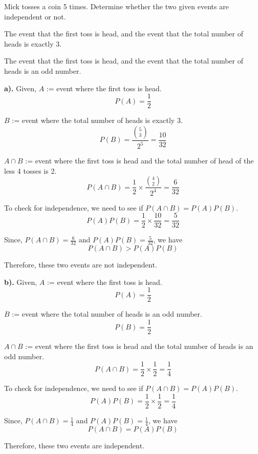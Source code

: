 \documentclass[a4paper, 10pt]{article}
\begin{document}
\pagebreak

\begin{problem}
Mick tosses a coin 5 times.
Determine whether the two given events are independent or not.
\begin{subproblems_alpha}
	\item The event that the first toss is head, and the event that the total number of heads is exactly 3.
	\item The event that the first toss is head, and the event that the total number of heads is an odd number.
\end{subproblems_alpha}
\end{problem}

\begin{solution}
	\par\noindent\textbf{a).} Given, \newline
	\( A \) := event where the first toss is head.
	\[
		P(A) = \frac{1}{2}
	\]

	\( B \) := event where the total number of heads is exactly 3.
	\[
		P(B) = \frac{\binom{5}{3}}{2^5} = \frac{10}{32}
	\]

	\( A \cap B \) := event where the first toss is head and the total number of head of the less 4 tosses is 2.
	\[
		P(A \cap B) = \frac{1}{2} \times \frac{\binom{4}{2}}{2^4} = \frac{6}{32}
	\]

	To check for independence, we need to see if \( P(A \cap B) = P(A)P(B) \).
	\[
		P(A)P(B) = \frac{1}{2} \times \frac{10}{32} = \frac{5}{32}
	\]

	Since, \( P(A \cap B) = \frac{6}{32} \) and \( P(A)P(B) = \frac{5}{32} \), we have
	\[
		P(A \cap B) > P(A)P(B)
	\]

	Therefore, these two events are \( \boxed{\text{not independent}} \).
	
	\myspace

	\par\noindent\textbf{b).} Given, \newline
	\( A \) := event where the first toss is head.
	\[
		P(A) = \frac{1}{2}
	\]

	\( B \) := event where the total number of heads is an odd number.
	\[
		P(B) = \frac{1}{2}
	\]

	\( A \cap B \) := event where the first toss is head and the total number of heads is an odd number.
	\[
		P(A \cap B) = \frac{1}{2} \times \frac{1}{2} = \frac{1}{4}
	\]

	To check for independence, we need to see if \( P(A \cap B) = P(A)P(B) \).
	\[
		P(A)P(B) = \frac{1}{2} \times \frac{1}{2} = \frac{1}{4}
	\]

	Since, \( P(A \cap B) = \frac{1}{4} \) and \( P(A)P(B) = \frac{1}{4} \), we have
	\[
		P(A \cap B) = P(A)P(B)
	\]

	Therefore, these two events are \( \boxed{\text{independent}} \).
\end{solution}
\end{document}
